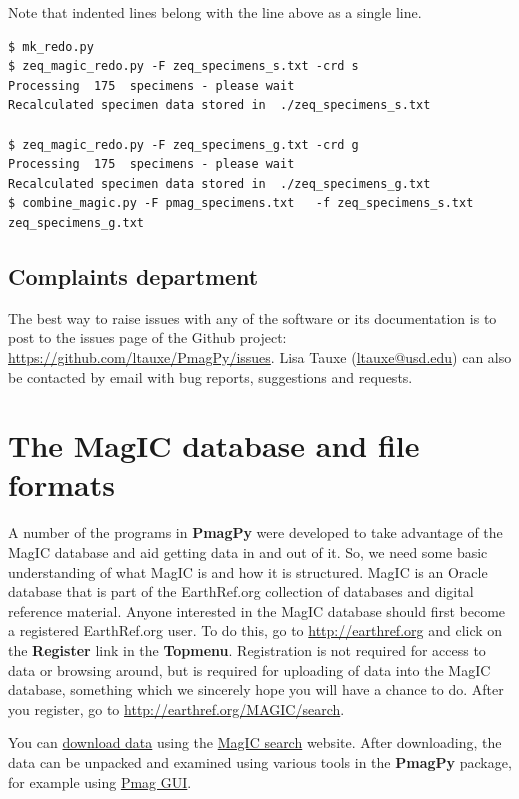 \documentclass[11pt]{book}
\begin{document}
{{{Note that indented lines belong with the line above as a single line.

\begin{verbatim}
$ mk_redo.py
$ zeq_magic_redo.py -F zeq_specimens_s.txt -crd s
Processing  175  specimens - please wait
Recalculated specimen data stored in  ./zeq_specimens_s.txt

$ zeq_magic_redo.py -F zeq_specimens_g.txt -crd g
Processing  175  specimens - please wait
Recalculated specimen data stored in  ./zeq_specimens_g.txt
$ combine_magic.py -F pmag_specimens.txt   -f zeq_specimens_s.txt zeq_specimens_g.txt
\end{verbatim}

%
\section{Complaints department}

The best way to raise issues with any of the software or its documentation is to post to the issues page of the Github project: \url{https://github.com/ltauxe/PmagPy/issues}. Lisa Tauxe (\href{mailto:ltauxe@ucsd.edu}{ltauxe@usd.edu}) can also be contacted by email with bug reports, suggestions and requests.

\chapter{The MagIC database and file formats}

A number of the programs in {\bf PmagPy} were  developed to take advantage of the MagIC database and aid getting data in and out of it.   So, we need some basic understanding of what MagIC is and how it is structured.
MagIC  is an Oracle  database that is part of the EarthRef.org collection of databases and digital reference material.
Anyone interested in the MagIC database should first become a registered EarthRef.org user.  To do this, go to \url{http://earthref.org} and click on the {\bf Register} link in the {\bf Topmenu}.   Registration is not required for access to data or browsing around, but is required for uploading of data into the MagIC database, something which we sincerely hope you will have a chance to do.
After you register, go to \url{http://earthref.org/MAGIC/search}.


You can \href{#magic_download}{download data} using the \href{http://earthref.org/MAGIC/search}{MagIC search} website.
%
%
%
       After downloading, the data can be unpacked and examined using various tools in the {\bf PmagPy}  package, for example using \href{#pmag_gui.py}{Pmag GUI}.

}}}
\end{document}
